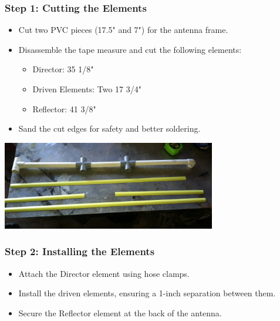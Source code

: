 \documentclass{beamer}
\begin{document}
\begin{frame}
    \frametitle{Step 1: Cutting the Elements}
    \begin{itemize}
        \item Cut two PVC pieces (17.5" and 7") for the antenna frame.
        \item Disassemble the tape measure and cut the following elements:
        \begin{itemize}
            \item Director: 35 1/8"
            \item Driven Elements: Two 17 3/4"
            \item Reflector: 41 3/8"
        \end{itemize}
        \item Sand the cut edges for safety and better soldering.
    \end{itemize}
    \begin{center}
    \includegraphics[width=0.7\textwidth]{images/cutting-elements.jpg} %
    \end{center}
\end{frame}

\begin{frame}
    \frametitle{Step 2: Installing the Elements}
    \begin{itemize}
        \item Attach the Director element using hose clamps.
        \item Install the driven elements, ensuring a 1-inch separation between them.
        \item Secure the Reflector element at the back of the antenna.
    \end{itemize}
\end{frame}
\end{document}
